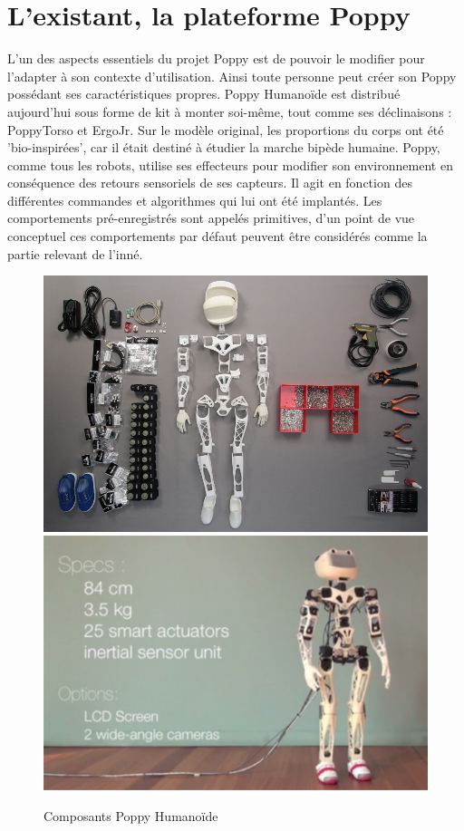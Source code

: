 \section{L'existant, la plateforme Poppy}\label{sec:poppy}
    L'un des aspects essentiels du projet Poppy est de pouvoir le modifier pour l'adapter à son contexte d'utilisation. Ainsi toute personne peut créer son Poppy possédant ses caractéristiques propres. Poppy Humanoïde est distribué aujourd'hui sous forme de kit à monter soi-même, tout comme ses déclinaisons : PoppyTorso et ErgoJr. 
    Sur le modèle original, les proportions du corps ont été 'bio-inspirées', car il était destiné à étudier la marche bipède humaine.
    Poppy, comme tous les robots, utilise ses effecteurs pour modifier son environnement en conséquence des retours sensoriels de ses capteurs. Il agit en fonction des différentes commandes et algorithmes qui lui ont été implantés. Les comportements pré-enregistrés sont appelés primitives, d'un point de vue conceptuel ces comportements par défaut peuvent être considérés comme la partie relevant de l'inné.
    \begin{figure}[!h]
        \centering
        \includegraphics[width=0.45\linewidth]{Figures/poppy_components}
        \includegraphics[width=0.45\linewidth]{Figures/poppy_spec}
        \caption{Composants Poppy Humanoïde}
        \label{fig:poppy_spec}
    \end{figure}\par%

